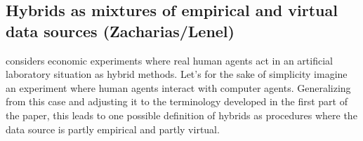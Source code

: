 \documentclass[12pt, a4paper]{article}
\numberwithin{equation}{section}
\begin{document}
%
%

\subsection{Hybrids as mixtures of empirical and virtual data sources (Zacharias/Lenel)}

\citet{guala:2002} considers economic experiments where real human agents act in an artificial laboratory situation as hybrid methods. Let's for the sake of simplicity imagine an experiment where human agents interact with computer agents. Generalizing from this case and adjusting it to the terminology developed in the first part of the paper, this leads to one possible definition of hybrids as procedures where the data source is partly empirical and partly virtual.
\end{document}
